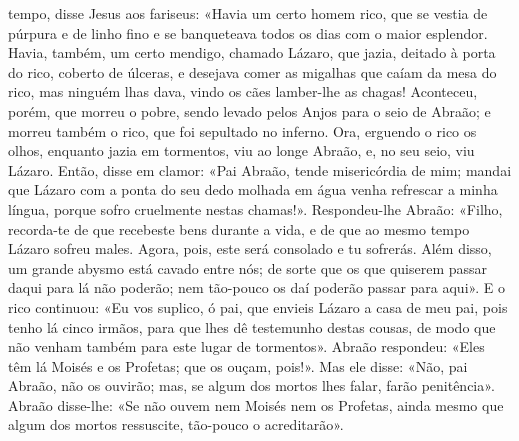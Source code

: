 \begin{paracol}{2}
{ tempo, disse Jesus aos fariseus: «Havia um certo homem rico, que se vestia de púrpura e de linho fino e se banqueteava todos os dias com o maior esplendor. Havia, também, um certo mendigo, chamado Lázaro, que jazia, deitado à porta do rico, coberto de úlceras, e desejava comer as migalhas que caíam da mesa do rico, mas ninguém lhas dava, vindo os cães lamber-lhe as chagas! Aconteceu, porém, que morreu o pobre, sendo levado pelos Anjos para o seio de Abraão; e morreu também o rico, que foi sepultado no inferno. Ora, erguendo o rico os olhos, enquanto jazia em tormentos, viu ao longe Abraão, e, no seu seio, viu Lázaro. Então, disse em clamor: «Pai Abraão, tende misericórdia de mim; mandai que Lázaro com a ponta do seu dedo molhada em água venha refrescar a minha língua, porque sofro cruelmente nestas chamas!». Respondeu-lhe Abraão: «Filho, recorda-te de que recebeste bens durante a vida, e de que ao mesmo tempo Lázaro sofreu males. Agora, pois, este será consolado e tu sofrerás. Além disso, um grande abysmo está cavado entre nós; de sorte que os que quiserem passar daqui para lá não poderão; nem tão-pouco os daí poderão passar para aqui». E o rico continuou: «Eu vos suplico, ó pai, que envieis Lázaro a casa de meu pai, pois tenho lá cinco irmãos, para que lhes dê testemunho destas cousas, de modo que não venham também para este lugar de tormentos». Abraão respondeu: «Eles têm lá Moisés e os Profetas; que os ouçam, pois!». Mas ele disse: «Não, pai Abraão, não os ouvirão; mas, se algum dos mortos lhes falar, farão penitência». Abraão disse-lhe: «Se não ouvem nem Moisés nem os Profetas, ainda mesmo que algum dos mortos ressuscite, tão-pouco o acreditarão».
}\end{paracol}

\begin{paracol}{2}\switchcolumn{}\end{paracol}

